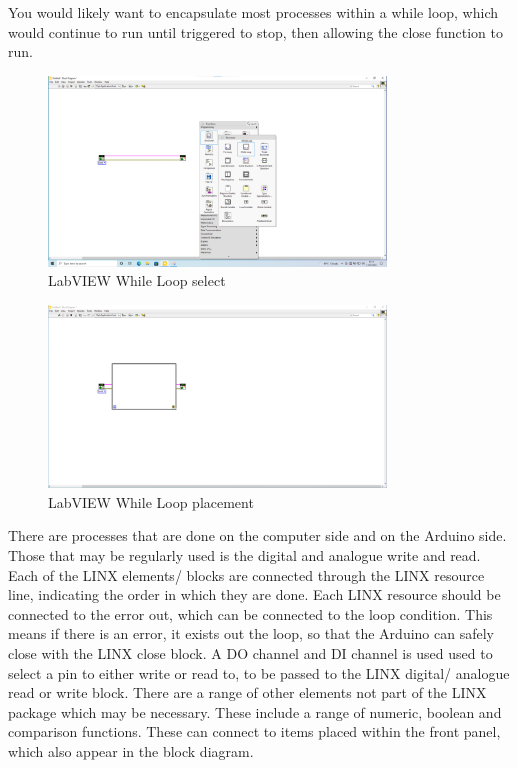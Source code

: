 \documentclass[a4paper,11pt]{report}
\begin{document}
You would likely want to encapsulate most processes within a while loop, which would continue to run until triggered to stop, then allowing the close function to run.

\begin{figure}[H]
\centering
\includegraphics[width=0.8\textwidth]{screenshots/labview8}
\caption{LabVIEW While Loop select}
\end{figure}

\begin{figure}[H]
\centering
\includegraphics[width=0.8\textwidth]{screenshots/labview9}
\caption{LabVIEW While Loop placement}
\end{figure}

There are processes that are done on the computer side and on the Arduino side. Those that may be regularly used is the digital and analogue write and read. Each of the LINX elements/ blocks are connected through the LINX resource line, indicating the order in which they are done. Each LINX resource should be connected to the error out, which can be connected to the loop condition. This means if there is an error, it exists out the loop, so that the Arduino can safely close with the LINX close block. A DO channel and DI channel is used used to select a pin to either write or read to, to be passed to the LINX digital/ analogue read or write block. There are a range of other elements not part of the LINX package which may be necessary. These include a range of numeric, boolean and comparison functions. These can connect to items placed within the front panel, which also appear in the block diagram.
\end{document}
